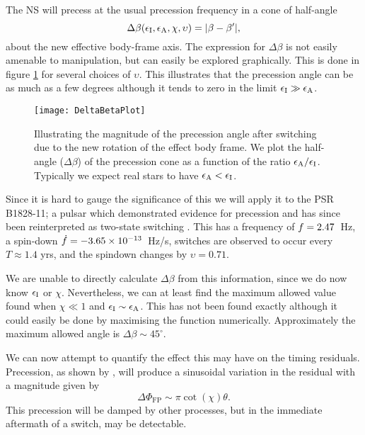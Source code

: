 \documentclass[../full_thesis/full_thesis.tex]{subfiles}
\begin{document}
The NS will precess at the usual precession frequency in a cone  of half-angle
\begin{equation}
    \Delta\beta(\epsilon_{\mathrm{I}}, \epsilon_{\mathrm{A}}, \chi, \upsilon)=|\beta - \beta'|,
\end{equation}
about the new effective body-frame axis.  The expression for $\Delta \beta$ is
not easily amenable to manipulation, but can easily be explored graphically.
This is done in figure \ref{fig: DeltaBetaPlot} for several choices of
$\upsilon$. This illustrates that the precession angle can be as much as a few
degrees although it tends to zero in the limit $\epsilon_{\mathrm{I}} \gg \epsilon_{\mathrm{A}}$.

\begin{figure}[htb]
    \centering
    \texttt{[image: DeltaBetaPlot]}
    \caption{Illustrating the magnitude of the precession angle after switching
        due to the new rotation of the effect body frame. We plot the half-angle
        ($\Delta\beta$) of the precession cone as a function of the ratio
    $\epsilon_{\mathrm{A}}/\epsilon_{\mathrm{I}}$. Typically we expect real stars to have $\epsilon_{\mathrm{A}} < \epsilon_{\mathrm{I}}$.}
    \label{fig: DeltaBetaPlot}
\end{figure}

Since it is hard to gauge the significance of this we will apply it to the
PSR B1828-11; a pulsar which demonstrated evidence for precession \citet{Stairs2000}
and has since been reinterpreted as two-state switching \citep{Lyne2010}. This
has a frequency of $f = 2.47$~Hz, a spin-down $\dot{f}=-3.65\times10^{-13}$~Hz/s, switches are
observed to occur every $T\approx 1.4$ yrs, and the spindown changes by $\upsilon = 0.71$.

We are unable to directly calculate $\Delta\beta$ from this information, since
we do now know $\epsilon_{\mathrm{I}}$ or $\chi$. Nevertheless, we can at least find the maximum
allowed value found when $\chi \ll 1$ and $\epsilon_{\mathrm{I}} \sim \epsilon_{\mathrm{A}}$. This has not 
been found exactly although it could easily be done by maximising the function 
numerically. Approximately the maximum allowed angle is $\Delta\beta \sim 45^{\circ}$.

We can now attempt to quantify the effect this may have on the timing residuals.
Precession, as shown by \citet{Jones2001}, will produce a sinusoidal variation
in the residual with a magnitude given by 
\begin{equation}
    \Delta\Phi_{\mathrm{FP}} \sim \pi \cot(\chi) \theta.
\end{equation}
This precession will be damped by other processes, but in the immediate aftermath
of a switch, may be detectable. 
\end{document}
